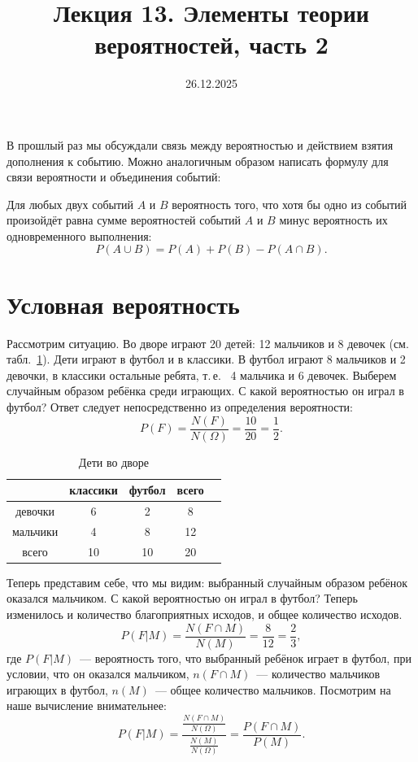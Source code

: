 \documentclass[12pt,a4paper]{article}
\title{Лекция 13. Элементы теории вероятностей, часть 2}
\date{26.12.2025}
\begin{document}
В прошлый раз мы обсуждали связь между вероятностью и действием взятия дополнения к событию. Можно аналогичным образом написать формулу для связи вероятности и объединения событий:

\begin{theorem*}
	Для любых двух событий $A$ и $B$ вероятность того, что хотя бы одно из событий произойдёт равна сумме вероятностей событий $A$ и $B$ минус вероятность их одновременного выполнения:
	$$
		P(A\cup B)=P(A)+P(B)-P(A\cap B).
	$$
\end{theorem*}\section{Условная вероятность}

Рассмотрим ситуацию. Во дворе играют 20 детей: 12 мальчиков и 8 девочек (см.
табл.~\ref{deti}). Дети играют в футбол и в классики. В футбол играют 8 мальчиков и 2 девочки, в классики остальные ребята, т.\,е. ~4 мальчика и 6 девочек. Выберем случайным образом ребёнка среди играющих. С какой вероятностью он играл в футбол? Ответ следует непосредственно из определения вероятности:
$$
	P(F)=\frac{N(F)}{N(\Omega)}=\frac{10}{20}=\frac{1}{2}.
$$

\begin{table}[b]
	\begin{center}
		\begin{tabular}{|c|c|c|c|c|}
			\hline
			& классики & футбол & всего \\
			\hline
			девочки & 6 & 2 & 8 \\
			\hline
			мальчики & 4 & 8 & 12 \\
			\hline
			всего & 10 & 10 & 20 \\
			\hline
		\end{tabular}
		\caption{Дети во дворе}\label{deti}
	\end{center}
\end{table}
Теперь представим себе, что мы видим: выбранный случайным образом ребёнок оказался мальчиком. С какой вероятностью он играл в футбол? Теперь изменилось и количество благоприятных исходов, и общее количество исходов.
$$
	P(F|M)=\frac{N(F\cap M)}{N(M)}=\frac{8}{12}=\frac{2}{3},
$$
где $P(F|M)$~--- вероятность того, что выбранный ребёнок играет в футбол, при условии, что он оказался мальчиком, $n(F\cap M)$~--- количество мальчиков играющих в футбол, $n(M)$~--- общее количество мальчиков. Посмотрим на наше вычисление внимательнее:
$$
	P(F|M)=\frac{\frac{N(F\cap M)}{N(\Omega)}}{\frac{N(M)}{N(\Omega)}}=\frac{P(F\cap M)}{P(M)}.
$$
\end{document}
